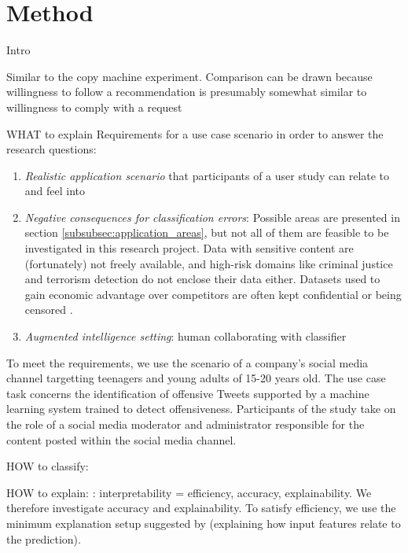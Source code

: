 \section{Method}
Intro

Similar to the copy machine experiment. Comparison can be drawn because willingness to follow a recommendation is presumably somewhat similar to willingness to comply with a request 

WHAT to explain
Requirements for a use case scenario in order to answer the research questions:
\begin{enumerate}
	\item \textit{Realistic application scenario} that participants of a user study can relate to and feel into
	\item \textit{Negative consequences for classification errors}: Possible areas are presented in section \ref{subsubsec:application_areas}, but not all of them are feasible to be investigated in this research project. Data with sensitive content are (fortunately) not freely available, and high-risk domains like criminal justice and terrorism detection do not enclose their data either. Datasets used to gain economic advantage over competitors are often kept confidential or being censored \cite{diakopoulos2016accountability}.
	\item \textit{Augmented intelligence setting}: human collaborating with classifier
\end{enumerate}
To meet the requirements, we use the scenario of a company's social media channel targetting teenagers and young adults of 15-20 years old. The use case task concerns the identification of offensive Tweets supported by a machine learning system trained to detect offensiveness. Participants of the study take on the role of a social media moderator and administrator responsible for the content posted within the social media channel. 

HOW to classify:



HOW to explain:
\cite{ruping2006learning}: interpretability = efficiency, accuracy, explainability.
We therefore investigate accuracy and explainability. To satisfy efficiency, we use the minimum explanation setup suggested by \cite{goodman16eu} (explaining how input features relate to the prediction). 



